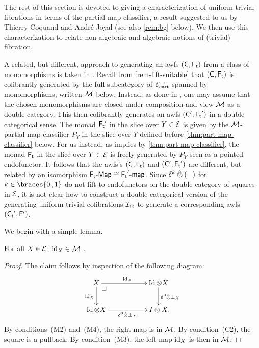\documentclass[reqno,10pt,a4paper,oneside,draft]{amsart}
\begin{document}
{{The rest of this section is devoted to giving a characterization of uniform trivial fibrations in terms of the partial map classifier, a result suggested to us by Thierry Coquand and Andr\'e Joyal (see also \cref{rem:bg} below).
We then use this characterization to relate non-algebraic and algebraic notions of (trivial) fibration.

\begin{remark}
\label{rem:bg}
A related, but different, approach to generating an awfs $(\CC, \TF)$ from a class of monomorphisms is taken in \cite{bourke-garner-I}.
Recall from \cref{rem-lift-suitable} that $(\CC, \TF)$ is cofibrantly generated by  the full subcategory of 
$\cal{E}^\to_\cart$ spanned by monomorphisms, written $\cal{M}$ below.
Instead, as done in \cite{bourke-garner-I}, one may assume that the chosen monomorphisms are closed under composition and view $\cal{M}$ as a double category.
This then cofibrantly generates an awfs $(\CC', \TF')$ in a double categorical sense.
The monad $\TF'$ in the slice over $Y \in \cal{E}$ is given by the $\cal{M}$-partial map classifier $P_Y$ in the slice over $Y$ defined before \cref{thm:part-map-classifier} below.
For us instead, as implies by \cref{thm:part-map-classifier}, the monad $\TF$ in the slice over $Y \in \cal{E}$ is freely generated by $P_Y$ seen as a pointed endofunctor.
It follows that the awfs's $(\CC, \TF)$ and $(\CC', \TF')$ are different, but related by an isomorphism $\pAlg{\TF} \cong \palg{\TF'}$.
Since $\delta^k \hatotimes (-)$ for $k \in \braces{0\,,1}$ do not lift to endofunctors on the double category of squares in $\cal{E}$, it is not clear how to construct a double categorical version of the generating uniform trivial cofibrations $\cal{I}_\otimes$ to generate a corresponding awfs $(\TC', \FF')$.
\end{remark}

We begin with a simple lemma.

\begin{lemma} \label{identities-in-M}
For all $X \in \cal{E}$, $\id_X \in \cal{M}$ .
\end{lemma}

\begin{proof}
The claim follows by inspection of the following diagram:
\[
\xymatrix@C+3em{
  X
  \ar[r]^{\id_X}
  \ar[d]_{\id_X}
  \pullback{dr}
&
  \Id \otimes X
  \ar[d]^{\delta^0 \hatotimes \bot_X}
\\
  \Id \otimes X
  \ar[r]_{\delta^0 \hatotimes \bot_X}
&
  I \otimes X
\rlap{.}}
\]
By conditions~(M2) and~(M4), the right map is in $\cal{M}$.
By condition~(C2), the square is a pullback.
By condition~(M3), the left map $\id_X$ is then in $\cal{M}$.
\end{proof}

}}
\end{document}
